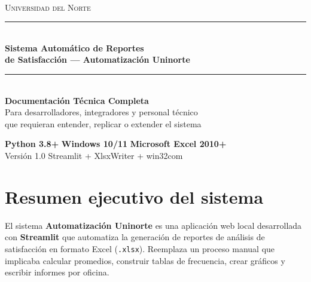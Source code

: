 \documentclass[12pt, letterpaper]{article}
\begin{document}
\begin{titlepage}
  \pagecolor{uninorteazul}\color{white}\centering
  \vspace*{1.5cm}
  {\fontsize{60}{70}\selectfont\faFileCode}\\[0.8cm]
  {\scshape\large Universidad del Norte}\\[0.3cm]
  \rule{11cm}{0.5pt}\\[0.6cm]
  {\fontsize{26}{32}\selectfont\bfseries
    Sistema Automático de Reportes\\[0.3em]
    de Satisfacción — Automatización Uninorte
  }\\[0.8cm]
  \rule{11cm}{0.5pt}\\[0.8cm]
  {\Large\bfseries Documentación Técnica Completa}\\[0.5cm]
  {\normalsize
    Para desarrolladores, integradores y personal técnico\\[0.3em]
    que requieran entender, replicar o extender el sistema
  }
  \vfill
  \begin{tcolorbox}[colback=white!12!uninorteazul,colframe=white,
      width=11cm,rounded corners,arc=6pt,boxrule=1pt]
    \centering\color{white}\small
    \faPython\; \textbf{Python 3.8+} \quad
    \faDesktop\; \textbf{Windows 10/11} \quad
    \faFileExcel\; \textbf{Microsoft Excel 2010+}\\[4pt]
    \faTag\; Versión 1.0 \quad
    \faCalendar{} \quad
    \faCodeBranch\; Streamlit + XlsxWriter + win32com
  \end{tcolorbox}
  \vspace{1.2cm}
\end{titlepage}
\nopagecolor

\newpage
\tableofcontents
\newpage

\section{Resumen ejecutivo del sistema}

El sistema \textbf{Automatización Uninorte} es una aplicación web local desarrollada con \textbf{Streamlit} que automatiza la generación de reportes de análisis de satisfacción en formato Excel (\texttt{.xlsx}). Reemplaza un proceso manual que implicaba calcular promedios, construir tablas de frecuencia, crear gráficos y escribir informes por oficina.
\end{document}
